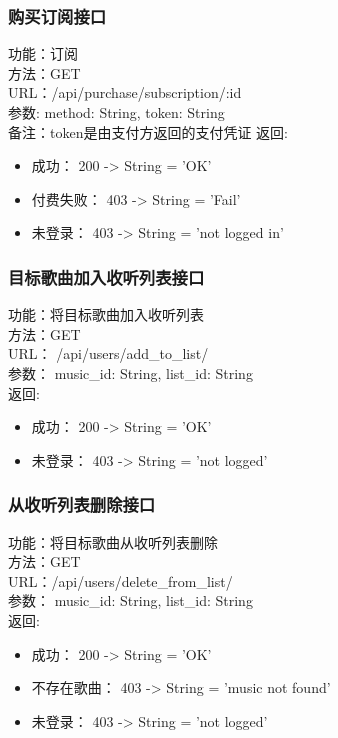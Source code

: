 \subsubsection{购买订阅接口}

\noindent
功能：订阅\\
方法：GET\\
URL：/api/purchase/subscription/:id\\
参数: method: String, token: String\\
备注：token是由支付方返回的支付凭证
返回:
\begin{itemize}
	\item 成功： 200 -> String = 'OK'
	\item 付费失败： 403 -> String = 'Fail'
	\item 未登录： 403 -> String = 'not logged in'
\end{itemize}

\subsubsection{目标歌曲加入收听列表接口}

\noindent
功能：将目标歌曲加入收听列表\\
方法：GET\\
URL： /api/users/add\_to\_list/\\
参数： music\_id: String, list\_id: String\\
返回:
\begin{itemize}
	\item 成功： 200 -> String = 'OK'
	\item 未登录： 403 -> String = 'not logged'
\end{itemize}


\subsubsection{从收听列表删除接口}

\noindent
功能：将目标歌曲从收听列表删除\\
方法：GET\\
URL：/api/users/delete\_from\_list/\\
参数： music\_id: String, list\_id: String\\
返回:
\begin{itemize}
	\item 成功： 200 -> String = 'OK'
	\item 不存在歌曲： 403 -> String = 'music not found'
	\item 未登录： 403 -> String = 'not logged'
\end{itemize}

